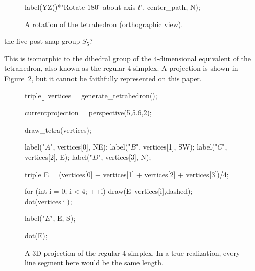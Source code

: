 \documentclass[../key.tex]{subfiles}
\begin{document}
\begin{figure}[h]
\begin{center}
\begin{minipage}[b]{\textwidth}
\begin{asy}[width=0.5\textwidth]
			label(YZ()*"Rotate $180^\circ$ about axis $l$", center_path, N);
			\end{asy}
		\end{minipage}
	\end{center}
	\vspace*{-2\baselineskip}
	\begin{center}
		\begin{minipage}[t]{\textwidth}
			\caption{A rotation of the tetrahedron (orthographic view).}
			\label{fig:tetra_element}
		\end{minipage}
	\end{center}
	\vspace*{-2\baselineskip}
\end{figure}

\begin{inner_problem}
\item the five post snap group $S_5$?
\end{inner_problem}

\noindent This is isomorphic to the dihedral group of the $4$-dimensional equivalent of the tetrahedron, also known as the regular $4$-simplex. A projection is shown in Figure~\ref{fig:four_simplex_attempt}, but it cannot be faithfully represented on this paper.

\begin{figure}[h]
	\begin{center}
		\begin{minipage}[b]{\textwidth}
			\centering
			\begin{asy}[width=0.3\textwidth]
			
			triple[] vertices = generate_tetrahedron();
			
			currentprojection = perspective(5,5.6,2);
			
			draw_tetra(vertices);
			
			
			label("$A$", vertices[0], NE);
			label("$B$", vertices[1], SW);
			label("$C$", vertices[2], E);
			label("$D$", vertices[3], N);
			
			triple E = (vertices[0] + vertices[1] + vertices[2] + vertices[3])/4;
			
			for (int i = 0; i < 4; ++i) {
				draw(E--vertices[i],dashed);
				dot(vertices[i]);
			}
			
			label("$E$", E, S);
			
			dot(E);
			
			\end{asy}
		\end{minipage}
	\end{center}
	\vspace*{-2\baselineskip}
	\begin{center}
		\begin{minipage}[t]{\textwidth}
			\caption{A 3D projection of the regular $4$-simplex. In a true realization, every line segment here would be the same length.}
			\label{fig:four_simplex_attempt}
		\end{minipage}
	\end{center}
	\vspace*{-2\baselineskip}
\end{figure}
\end{document}
